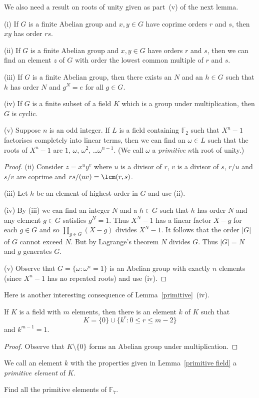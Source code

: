 We also need a result on roots of unity
given as part~(v) of the next lemma.
\begin{lemma}\label{primitive} (i) If $G$
is a finite Abelian
group and $x,y\in G$ have coprime orders
$r$ and $s$, then $xy$ has order $rs$.

(ii) If $G$ is a finite Abelian
group and $x,y\in G$ have orders
$r$ and $s$, then we can find an element
$z$ of $G$ with order the lowest common multiple
of $r$ and $s$.

(iii) If $G$ is a finite Abelian
group, then there exists an $N$ and
an $h\in G$ such that $h$ has order $N$
and $g^{N}=e$ for all $g\in G$.

(iv) If $G$ is a finite subset of a field $K$
which is a group under multiplication, then
$G$ is cyclic.

(v) Suppose $n$ is an odd integer.
If $L$ is a field containing ${\mathbb F}_{2}$
such that $X^{n}-1$ factorises completely
into linear terms, then we can find
an $\omega\in L$ such that the roots
of $X^{n}-1$ are $1$, $\omega$, $\omega^{2}$,
\dots $\omega^{n-1}$. (We call $\omega$ a
\emph{primitive} $n$th root of unity.)
\end{lemma}
\begin{proof} (ii) Consider $z=x^{u}y^{v}$
where $u$ is a divisor of $r$, $v$ is a divisor
of $s$, $r/u$ and $s/v$ are coprime and
$rs/(uv)=\lcm(r,s)$.

(iii) Let $h$ be an element of highest order
in $G$ and use (ii).

(iv) By (iii) we can find an integer
$N$ and a $h\in G$ such that $h$
has order $N$ and any element $g\in G$
satisfies $g^{N}=1$. Thus $X^{N}-1$
has a linear factor $X-g$ for each $g\in G$
and so $\prod_{g\in G}(X-g)$ divides $X^{N}-1$.
It follows that the order $|G|$ of $G$ cannot
exceed $N$. But by Lagrange's theorem $N$ divides $G$.
Thus $|G|=N$ and $g$ generates $G$.

(v) Observe that $G=\{\omega:\omega^{n}=1\}$ is
an Abelian group with exactly $n$ elements
(since $X^{n}-1$ has no repeated roots) and
use (iv).
\end{proof}

Here is another interesting consequence of
Lemma~\ref{primitive}~(iv).
\begin{lemma}\label{primitive field}
If $K$ is a field with $m$ elements,
then there is an
element $k$ of $K$ such that
\[K=\{0\}\cup\{k^{r}:0\leq r\leq m-2\}\]
and $k^{m-1}=1$.
\end{lemma}
\begin{proof} Observe that $K\setminus\{0\}$ forms 
an Abelian group
under multiplication.
\end{proof}
We call an element $k$ with the properties
given in Lemma~\ref{primitive field}
a \emph{primitive element} of $K$.
\begin{exercise} Find all the primitive elements of ${\mathbb F}_{7}$.
\end{exercise}

